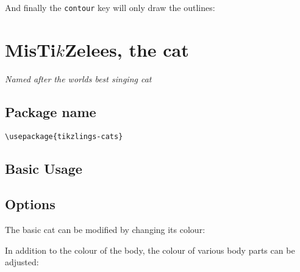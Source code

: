 \documentclass[parskip=half]{scrartcl}
\begin{document}
And finally the \lstinline|contour| key will only draw the outlines:
\begin{tcblisting}{}
\bug[contour=black]
\end{tcblisting}

%
%
\clearpage
\section[Cat]{MisTi$k$Zelees, the cat}

\emph{Named after the worlds best singing cat}

\subsection{Package name}

\begin{tcolorbox}[lower separated=false, lefthand width=.8\linewidth]
\vspace*{0.5cm}
\lstinline|\usepackage{tikzlings-cats}| 
\vspace*{0.5cm}
\end{tcolorbox}

\subsection{Basic Usage}

\begin{tcblisting}{}
\cat
\end{tcblisting}

\subsection{Options}

The basic cat can be modified by changing its colour:
\begin{tcblisting}{}
\cat[body=blue]
\end{tcblisting}

In addition to the colour of the body, the colour of various body parts can be adjusted:
\begin{tcblisting}{}
\cat[eye=green]
\end{tcblisting}
\begin{tcblisting}{}
\cat[pupil=red]
\end{tcblisting}
\begin{tcblisting}{}
\cat[nose=red]
\end{tcblisting}
\begin{tcblisting}{}
\cat[whiskers=red]
\end{tcblisting}
\begin{tcblisting}{}
\cat[paws=red]
\end{tcblisting}
\end{document}
